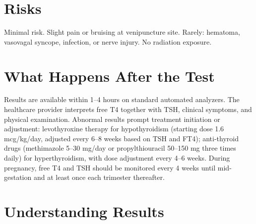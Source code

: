 \section*{Risks}
Minimal risk. Slight pain or bruising at venipuncture site. Rarely: hematoma, vasovagal syncope, infection, or nerve injury. No radiation exposure.

\section*{What Happens After the Test}
Results are available within 1--4 hours on standard automated analyzers. The healthcare provider interprets free T4 together with TSH, clinical symptoms, and physical examination. Abnormal results prompt treatment initiation or adjustment: levothyroxine therapy for hypothyroidism (starting dose 1.6 mcg/kg/day, adjusted every 6--8 weeks based on TSH and FT4); anti-thyroid drugs (methimazole 5--30 mg/day or propylthiouracil 50--150 mg three times daily) for hyperthyroidism, with dose adjustment every 4--6 weeks. During pregnancy, free T4 and TSH should be monitored every 4 weeks until mid-gestation and at least once each trimester thereafter.

\section*{Understanding Results}

